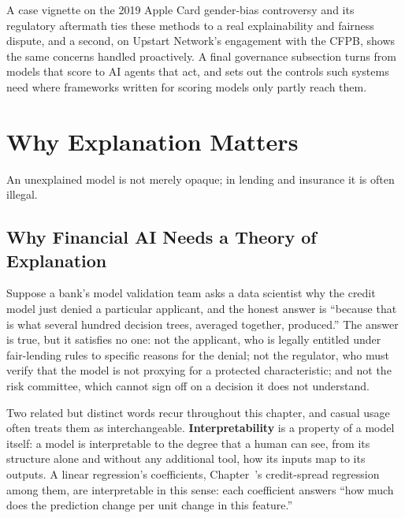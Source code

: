 \documentclass[../ai_in_finance]{subfiles}
\begin{document}
A case vignette on the 2019 Apple Card gender-bias controversy and its regulatory aftermath ties these methods to a real explainability and fairness dispute, and a second, on Upstart Network's engagement with the CFPB, shows the same concerns handled proactively. A final governance subsection turns from models that score to AI agents that act, and sets out the controls such systems need where frameworks written for scoring models only partly reach them.

\section{Why Explanation Matters}

An unexplained model is not merely opaque; in lending and insurance it is often illegal.

\subsection{Why Financial AI Needs a Theory of Explanation}
\label{sec:xai-why}

Suppose a bank's model validation team asks a data scientist why the credit model just denied a particular applicant, and the honest answer is ``because that is what several hundred decision trees, averaged together, produced.'' The answer is true, but it satisfies no one: not the applicant, who is legally entitled under fair-lending rules to specific reasons for the denial; not the regulator, who must verify that the model is not proxying for a protected characteristic; and not the risk committee, which cannot sign off on a decision it does not understand.

Two related but distinct words recur throughout this chapter, and casual usage often treats them as interchangeable. \textbf{Interpretability} is a property of a model itself: a model is interpretable to the degree that a human can see, from its structure alone and without any additional tool, how its inputs map to its outputs. A linear regression's coefficients, Chapter~'s credit-spread regression among them, are interpretable in this sense: each coefficient answers ``how much does the prediction change per unit change in this feature.''
\end{document}
